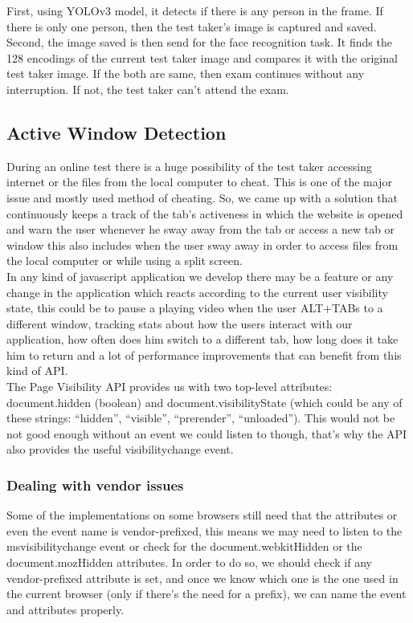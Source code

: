 \documentclass[12pt]{report}
\begin{document}
First, using YOLOv3 model, it detects if there is any person in the frame. If there is only one person, then the test taker’s image is captured and saved. Second, the image saved is then send for the face recognition task. It finds the 128 encodings of the current test taker image and compares it with the original test taker image. If the both are same, then exam continues without any interruption. If not, the test taker can’t attend the exam. 
\subsection{Active Window Detection}
During an online test there is a huge possibility of the test taker accessing internet or the files from the local computer to cheat. This is one of the major issue and mostly used method of cheating. So, we came up with a solution that continuously keeps a track of the tab’s activeness in which the website is opened and warn the user whenever he sway away from the tab or access a new tab or window this also includes when the user sway away in order to access files from the local computer or while using a split screen.\\

In any kind of javascript application we develop there may be a feature or any change in the application which reacts according to the current user visibility state, this could be to pause a playing video when the user ALT+TABs to a different window, tracking stats about how the users interact with our application, how often does him switch to a different tab, how long does it take him to return and a lot of performance improvements that can benefit from this kind of API.\\

The Page Visibility API provides us with two top-level attributes: document.hidden (boolean) and document.visibilityState (which could be any of these strings: “hidden”, “visible”, “prerender”, “unloaded”). This would not be not good enough without an event we could listen to though, that’s why the API also provides the useful visibilitychange event.
\subsubsection{Dealing with vendor issues}
Some of the implementations on some browsers still need that the attributes or even the event name is vendor-prefixed, this means we may need to listen to the msvisibilitychange event or check for the document.webkitHidden or the document.mozHidden attributes. In order to do so, we should check if any vendor-prefixed attribute is set, and once we know which one is the one used in the current browser (only if there’s the need for a prefix), we can name the event and attributes properly.
\end{document}

